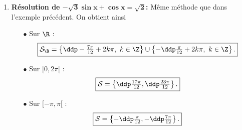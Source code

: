 \begin{correction}
\begin{enumerate}
\item  \textbf{R\'esolution de $\mathbf{ -\sqrt{3}\sin{x}+\cos{x}=\sqrt{2}}$:}
M\^{e}me m\'ethode que dans l'exemple pr\'ec\'edent. On obtient ainsi
\begin{itemize}
\item[$\bullet$] Sur $\R$ : 
$$\fbox{$\mathcal{S}_\R=\left\lbrace \ddp-\frac{7\pi}{12}+2k\pi,\ k\in\Z  \right\rbrace\cup \left\lbrace - \ddp\frac{\pi}{12}+2k\pi,\ k\in\Z  \right\rbrace .$}$$
\end{itemize}
\begin{minipage}[c]{0.45\linewidth}
\begin{itemize}
\item[$\bullet$] Sur $\lbrack 0,2\pi\lbrack$ : 
$$\fbox{$\mathcal{S}=\left\lbrace \ddp\frac{17\pi}{12},\ddp\frac{23\pi}{12} \right \rbrace.$}$$
\item[$\bullet$] Sur $\lbrack -\pi,\pi\lbrack$ :
$$\fbox{$\mathcal{S}=\left\lbrace -\ddp\frac{\pi}{12},-\ddp\frac{7\pi}{12} \right \rbrace.$}$$
\end{itemize}
\end{minipage}
\quad

\begin{center}
\end{center}


\end{enumerate}
\end{correction}
